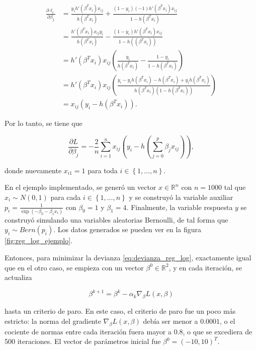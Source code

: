 \begin{equation}
  \label{eq:derivacion_ell_i_reg_log}
  \begin{split}
    \frac{\partial \ell_i}{\partial \beta_j} & = 
      \frac{y_i h'(\beta^T x_i) x_{ij} }  {h(\beta^T x_i)} + \frac{(1 - y_i) (-1) h'(\beta^T x_i) x_{ij}} {1 - h(\beta^T x_i)} \\
      & = \frac{h'(\beta^T x_i) x_{ij} y_i}{h(\beta^T x_i)} - \frac{(1 - y_i) h'(\beta^T x_i) x_{ij}}{1 - h((\beta^T x_i))} \\
      & = h'(\beta^T x_i) x_{ij} \left(\frac{y_i}{h(\beta^T x_i)} - \frac{1-y_i}{1-h(\beta^T x_i)} \right) \\
      & = h'(\beta^T x_i) x_{ij} \left(\frac{y_i - y_i h(\beta^T x_i) - 
          h(\beta^T x_i) + y_i h(\beta^T x_i)}{h(\beta^T x_i)(1-h(\beta^T x_i))} \right) \\
      & = x_{ij}(y_i - h(\beta^T x_i)).
  \end{split}
\end{equation}

Por lo tanto, se tiene que 

$$
  \frac{\partial L}{\partial \beta_j} = -\frac{2}{n} \sum_{i = 1}^n { x_{ij}(y_i - h(\sum_{j=0}^{p}{\beta_j x_{ij}})) },
$$

donde nuevamente $x_{i1} = 1$ para toda $i \in \left\{1, \hdots, n \right\}$.


En el ejemplo implementado, se generó un vector $x \in \mathbb{R}^n$ con $n = 1000$ tal que $x_i \sim N(0, 1)$ para cada $i \in \left\{1, \hdots, n \right\}$ y se construyó la variable auxiliar $p_i = \frac{1}{\exp \left( - \beta_0 - \beta_1 x_i \right)}$ con $\beta_0 = 1$ y $\beta_1 = 4$. Finalmente, la variable respuesta $y$ se construyó simulando una variables aleatorias Bernoulli, de tal forma que $y_i \sim Bern(p_i)$. Los datos generados se pueden ver en la figura \ref{fig:reg_log_ejemplo}.

Entonces, para minimizar la devianza \ref{eq:devianza_reg_log}, exactamente igual que en el otro caso, se empieza con un vector $\beta^0 \in \mathbb{R}^2$, y en cada iteración, se actualiza 

$$
  \beta^{k+1} = \beta^k - \alpha_k \nabla_{\beta} L(x, \beta)
$$

hasta un criterio de paro. En este caso, el criterio de paro fue un poco más estricto: la norma del gradiente $\nabla_{\beta} L(x, \beta)$ debía ser menor a $0.0001$, o el cociente de normas entre cada iteración fuera mayor a $0.8$, o que se excediera de 500 iteraciones. El vector de parámetros inicial fue $\beta^0 = (-10, 10)^T$. 


